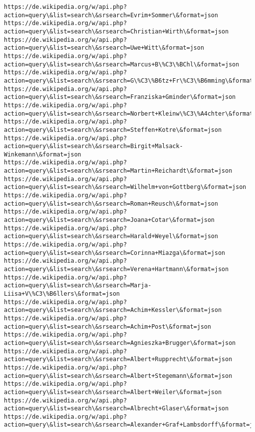 \documentclass[11pt]{article}
\begin{document}
    \begin{Verbatim}[commandchars=\\\{\}]
https://de.wikipedia.org/w/api.php?action=query\&list=search\&srsearch=Evrim+Sommer\&format=json
https://de.wikipedia.org/w/api.php?action=query\&list=search\&srsearch=Christian+Wirth\&format=json
https://de.wikipedia.org/w/api.php?action=query\&list=search\&srsearch=Uwe+Witt\&format=json
https://de.wikipedia.org/w/api.php?action=query\&list=search\&srsearch=Marcus+B\%C3\%BChl\&format=json
https://de.wikipedia.org/w/api.php?action=query\&list=search\&srsearch=G\%C3\%B6tz+Fr\%C3\%B6mming\&format=json
https://de.wikipedia.org/w/api.php?action=query\&list=search\&srsearch=Franziska+Gminder\&format=json
https://de.wikipedia.org/w/api.php?action=query\&list=search\&srsearch=Norbert+Kleinw\%C3\%A4chter\&format=json
https://de.wikipedia.org/w/api.php?action=query\&list=search\&srsearch=Steffen+Kotre\&format=json
https://de.wikipedia.org/w/api.php?action=query\&list=search\&srsearch=Birgit+Malsack-Winkemann\&format=json
https://de.wikipedia.org/w/api.php?action=query\&list=search\&srsearch=Martin+Reichardt\&format=json
https://de.wikipedia.org/w/api.php?action=query\&list=search\&srsearch=Wilhelm+von+Gottberg\&format=json
https://de.wikipedia.org/w/api.php?action=query\&list=search\&srsearch=Roman+Reusch\&format=json
https://de.wikipedia.org/w/api.php?action=query\&list=search\&srsearch=Joana+Cotar\&format=json
https://de.wikipedia.org/w/api.php?action=query\&list=search\&srsearch=Harald+Weyel\&format=json
https://de.wikipedia.org/w/api.php?action=query\&list=search\&srsearch=Corinna+Miazga\&format=json
https://de.wikipedia.org/w/api.php?action=query\&list=search\&srsearch=Verena+Hartmann\&format=json
https://de.wikipedia.org/w/api.php?action=query\&list=search\&srsearch=Marja-Liisa+V\%C3\%B6llers\&format=json
https://de.wikipedia.org/w/api.php?action=query\&list=search\&srsearch=Achim+Kessler\&format=json
https://de.wikipedia.org/w/api.php?action=query\&list=search\&srsearch=Achim+Post\&format=json
https://de.wikipedia.org/w/api.php?action=query\&list=search\&srsearch=Agnieszka+Brugger\&format=json
https://de.wikipedia.org/w/api.php?action=query\&list=search\&srsearch=Albert+Rupprecht\&format=json
https://de.wikipedia.org/w/api.php?action=query\&list=search\&srsearch=Albert+Stegemann\&format=json
https://de.wikipedia.org/w/api.php?action=query\&list=search\&srsearch=Albert+Weiler\&format=json
https://de.wikipedia.org/w/api.php?action=query\&list=search\&srsearch=Albrecht+Glaser\&format=json
https://de.wikipedia.org/w/api.php?action=query\&list=search\&srsearch=Alexander+Graf+Lambsdorff\&format=json

\end{Verbatim}
\end{document}
